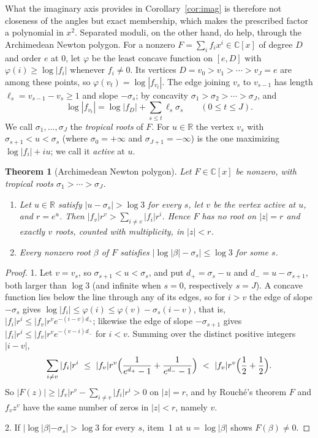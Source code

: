 \documentclass[11pt]{article}
\newtheorem{theorem}{Theorem}[section]
\newcommand{\R}{\mathbb R}
\begin{document}
What the imaginary axis provides in Corollary~\ref{cor:imag} is therefore
not closeness of the angles but exact membership, which makes the
prescribed factor a polynomial in $x^2$.  Separated moduli, on the other
hand, do help, through the Archimedean Newton polygon.  For a nonzero
$F=\sum_if_ix^i\in\mathbb C[x]$ of degree $D$ and order $e$ at $0$, let
$\varphi$ be the least concave function on $[e,D]$ with
$\varphi(i)\ge\log|f_i|$ whenever $f_i\ne0$.  Its vertices
$D=v_0>v_1>\cdots>v_J=e$ are among these points, so $\varphi(v_t)=\log|f_{v_t}|$.
The edge joining $v_s$ to $v_{s-1}$ has length $\ell_s=v_{s-1}-v_s\ge1$ and
slope $-\sigma_s$; by concavity $\sigma_1>\sigma_2>\cdots>\sigma_J$, and
\[
  \log|f_{v_t}|=\log|f_D|+\sum_{s\le t}\ell_s\sigma_s\qquad(0\le t\le J).
\]
We call $\sigma_1,\ldots,\sigma_J$ the \emph{tropical roots} of $F$.  For
$u\in\R$ the vertex $v_s$ with $\sigma_{s+1}<u<\sigma_s$ (where
$\sigma_0=+\infty$ and $\sigma_{J+1}=-\infty$) is the one maximizing
$\log|f_i|+iu$; we call it \emph{active} at $u$.

\begin{theorem}[Archimedean Newton polygon]\label{thm:archnewton}
Let $F\in\mathbb C[x]$ be nonzero, with tropical roots $\sigma_1>\cdots>\sigma_J$.
\begin{enumerate}
\item Let $u\in\R$ satisfy $|u-\sigma_s|>\log3$ for every $s$, let $v$ be the
vertex active at $u$, and $r=e^u$.  Then
$|f_v|r^v>\sum_{i\ne v}|f_i|r^i$.  Hence $F$ has no root on $|z|=r$ and
exactly $v$ roots, counted with multiplicity, in $|z|<r$.
\item Every nonzero root $\beta$ of $F$ satisfies
$\bigl|\log|\beta|-\sigma_s\bigr|\le\log3$ for some $s$.
\end{enumerate}
\end{theorem}

\begin{proof}
1.  Let $v=v_s$, so $\sigma_{s+1}<u<\sigma_s$, and put $d_+=\sigma_s-u$ and
$d_-=u-\sigma_{s+1}$, both larger than $\log3$ (and infinite when $s=0$,
respectively $s=J$).  A concave function lies below the line through any of
its edges, so for $i>v$ the edge of slope $-\sigma_s$ gives
$\log|f_i|\le\varphi(i)\le\varphi(v)-\sigma_s(i-v)$, that is,
$|f_i|r^i\le|f_v|r^ve^{-(i-v)d_+}$; likewise the edge of slope $-\sigma_{s+1}$
gives $|f_i|r^i\le|f_v|r^ve^{-(v-i)d_-}$ for $i<v$.  Summing over the
distinct positive integers $|i-v|$,
\[
  \sum_{i\ne v}|f_i|r^i\ \le\ |f_v|r^v\Bigl(\frac1{e^{d_+}-1}+\frac1{e^{d_-}-1}\Bigr)
  \ <\ |f_v|r^v\Bigl(\frac12+\frac12\Bigr).
\]
So $|F(z)|\ge|f_v|r^v-\sum_{i\ne v}|f_i|r^i>0$ on $|z|=r$, and by Rouch\'e's
theorem $F$ and $f_vz^v$ have the same number of zeros in $|z|<r$, namely $v$.

2.  If $|\log|\beta|-\sigma_s|>\log3$ for every $s$, item~1 at
$u=\log|\beta|$ shows $F(\beta)\ne0$.
\end{proof}
\end{document}
